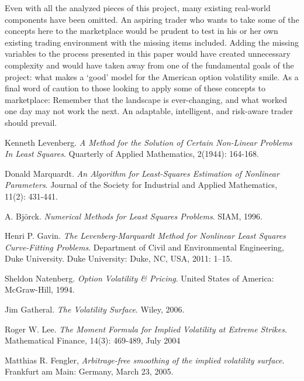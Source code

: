 \documentclass[12pt, a4paper, notitlepage]{article}
\numberwithin{equation}{subsection}
\numberwithin{figure}{subsection}
\numberwithin{table}{subsection}
\newcommand{\newpar}{\newline \newline}
\begin{document}
\newpar
Even with all the analyzed pieces of this project, many existing real-world components have been omitted.  An aspiring trader who wants to take some of the concepts here to the marketplace would be prudent to test in his or her own existing trading environment with the missing items included.  Adding the missing variables to the process presented in this paper would have created unnecessary complexity and would have taken away from one of the fundamental goals of the project: what makes a `good' model for the American option volatility smile.
\newpar
As a final word of caution to those looking to apply some of these concepts to marketplace:  Remember that the landscape is ever-changing, and what worked one day may not work the next.  An adaptable, intelligent, and risk-aware trader should prevail.

\newpage
\begin{thebibliography}{3}
	
    	Kenneth Levenberg.
        \textit{A Method for the Solution of Certain Non-Linear Problems In Least Squares}.
        Quarterly of Applied Mathematics, 2(1944): 164-168.
    
    	Donald Marquardt.
        \textit{An Algorithm for Least-Squares Estimation of Nonlinear Parameters}.  Journal of the Society for Industrial and Applied Mathematics, 11(2): 431-441.
    
        A. Bj\"orck.  \textit{Numerical Methods for Least Squares Problems}.
        SIAM, 1996.
        
        Henri P. Gavin.
        \textit{The Levenberg-Marquardt Method for Nonlinear Least Squares Curve-Fitting Problems}.
        Department of Civil and Environmental Engineering, Duke University.
        Duke University: Duke, NC, USA, 2011: 1–15.
    
    	Sheldon Natenberg.
        \textit{Option Volatility \& Pricing}.
        United States of America:  McGraw-Hill, 1994.
    
    	Jim Gatheral.
        \textit{The Volatility Surface}.
        Wiley, 2006.
    
    	Roger W. Lee.
        \textit{The Moment Formula for Implied Volatility at Extreme Strikes}.
        Mathematical Finance, 14(3): 469-489, July 2004
    
	  Matthias R. Fengler,
	  \textit{Arbitrage-free smoothing of the implied volatility surface}.
	  Frankfurt am Main: Germany,
	  March 23, 2005.
	  

\end{thebibliography}
\end{document}
